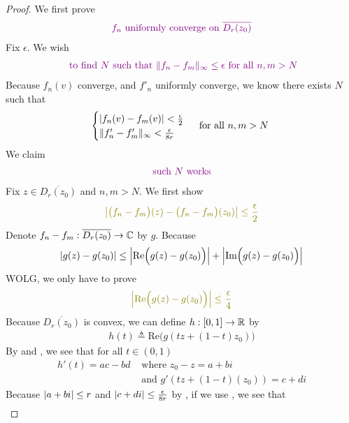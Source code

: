 \documentclass{report}
\begin{document}
\begin{proof}
We first prove 
\begin{align}
\label{fnun}
\textcolor{violet}{f_n\text{ uniformly converge on $\overline{D_r(z_0)}$}}
\end{align}
Fix $\epsilon $. We wish  
\begin{align*}
  \textcolor{violet}{\text{ to find $N$ such that $\| f_n-f_m \|_\infty \leq \epsilon $ for all $n,m>N$}}
\end{align*}
Because $f_n(v)$ converge, and $f'_n$ uniformly converge, we know there exists $N$ such that 
 \begin{align}
\label{UCD3}
\begin{cases}
 \left|f_n(v)-f_m(v)\right|<\frac{\epsilon}{2} \\
\| f_n'-f_m' \|_\infty <\frac{\epsilon }{8r}
\end{cases}\text{ for all $n,m>N$ }
\end{align}
We claim 
\begin{align*}
\textcolor{violet}{\text{ such $N$ works }}
\end{align*}
Fix $z \in \overline{D_r(z_0)}$ and $n,m>N$. We first show
\begin{align*}
\olive{\abso{\big(f_n-f_m\big)(z)-\big(f_n-f_m \big)(z_0)}\leq \frac{\epsilon}{2}}
\end{align*}
Denote $f_n-f_m:\overline{D_r(z_0)}\rightarrow \mathbb{C}$ by $g$. Because 
\begin{align*}
\left|g(z)-g(z_0)\right|\leq \left|\text{Re}\Big(g(z)-g(z_0) \Big)\right|+ \left|\text{Im}\Big(g(z)-g(z_0)\Big)\right|
\end{align*}
WOLG, we only have to prove 
\begin{align*}
\olive{\abso{\text{Re}\Big(g(z)-g(z_0) \Big)}\leq \frac{\epsilon}{4}}
\end{align*}
Because $\overline{D_r(z_0)}$ is convex, we can define $h:[0,1]\rightarrow \mathbb{R}$ by
\begin{align*}
h(t)\triangleq \text{Re}\Big(g(tz+(1-t)z_0) \Big)
\end{align*}
By  and , we see that for all $t\in (0,1)$ 
\begin{align*}
  h'(t)= ac-bd&\text{ where }z_0-z=a+b i \\
&\text{ and } g'(tz+(1-t)(z_0))=c+di
\end{align*}
Because $\left|a+b i\right|\leq r$ and $\left|c+di\right|\leq \frac{\epsilon}{8r}$ by  , if we use  , we see that 
\begin{align*}

\end{align*}
\end{proof}
\end{document}
